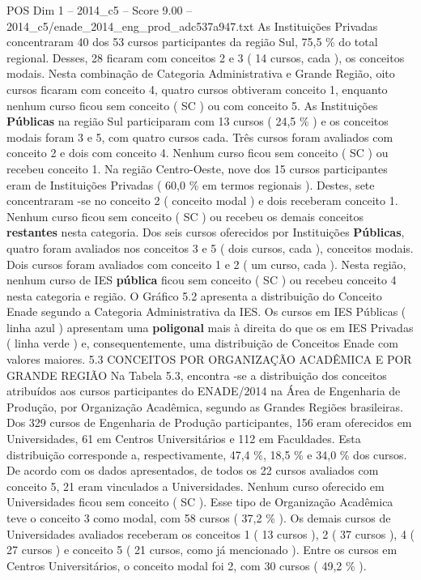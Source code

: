 \begin{textsample}{POS Dim 1 – 2014\_c5 – Score 9.00 – 2014\_c5/enade\_2014\_eng\_prod\_adc537a947.txt}
As Instituições Privadas concentraram 40 dos 53 cursos participantes da região Sul, 75,5 \% do total regional.
Desses, 28 ficaram com conceitos 2 e 3 ( 14 cursos, cada ), os conceitos modais.
Nesta combinação de Categoria Administrativa e Grande Região, oito cursos ficaram com conceito 4, quatro cursos obtiveram conceito 1, enquanto nenhum curso ficou sem conceito ( SC ) ou com conceito 5.
As Instituições \textbf{Públicas} na região Sul participaram com 13 cursos ( 24,5 \% ) e os conceitos modais foram 3 e 5, com quatro cursos cada.
Três cursos foram avaliados com conceito 2 e dois com conceito 4.
Nenhum curso ficou sem conceito ( SC ) ou recebeu conceito 1.
Na região Centro-Oeste, nove dos 15 cursos participantes eram de Instituições Privadas ( 60,0 \% em termos regionais ).
Destes, sete concentraram -se no conceito 2 ( conceito modal ) e dois receberam conceito 1.
Nenhum curso ficou sem conceito ( SC ) ou recebeu os demais conceitos \textbf{restantes} nesta categoria.
Dos seis cursos oferecidos por Instituições \textbf{Públicas}, quatro foram avaliados nos conceitos 3 e 5 ( dois cursos, cada ), conceitos modais.
Dois cursos foram avaliados com conceito 1 e 2 ( um curso, cada ).
Nesta região, nenhum curso de IES \textbf{pública} ficou sem conceito ( SC ) ou recebeu conceito 4 nesta categoria e região.
O Gráfico 5.2 apresenta a distribuição do Conceito Enade segundo a Categoria Administrativa da IES.
Os cursos em IES Públicas ( linha azul ) apresentam uma \textbf{poligonal} mais à direita do que os em IES Privadas ( linha verde ) e, consequentemente, uma distribuição de Conceitos Enade com valores maiores. 5.3 CONCEITOS POR ORGANIZAÇÃO ACADÊMICA E POR GRANDE REGIÃO Na Tabela 5.3, encontra -se a distribuição dos conceitos atribuídos aos cursos participantes do ENADE/2014 na Área de Engenharia de Produção, por Organização Acadêmica, segundo as Grandes Regiões brasileiras.
Dos 329 cursos de Engenharia de Produção participantes, 156 eram oferecidos em Universidades, 61 em Centros Universitários e 112 em Faculdades.
Esta distribuição corresponde a, respectivamente, 47,4 \%, 18,5 \% e 34,0 \% dos cursos.
De acordo com os dados apresentados, de todos os 22 cursos avaliados com conceito 5, 21 eram vinculados a Universidades.
Nenhum curso oferecido em Universidades ficou sem conceito ( SC ).
Esse tipo de Organização Acadêmica teve o conceito 3 como modal, com 58 cursos ( 37,2 \% ).
Os demais cursos de Universidades avaliados receberam os conceitos 1 ( 13 cursos ), 2 ( 37 cursos ), 4 ( 27 cursos ) e conceito 5 ( 21 cursos, como já mencionado ).
Entre os cursos em Centros Universitários, o conceito modal foi 2, com 30 cursos ( 49,2 \% ).

\end{textsample}
